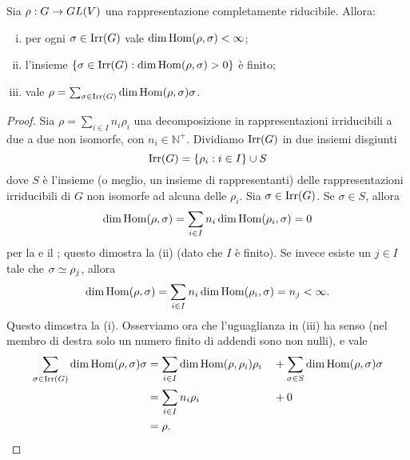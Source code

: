 \begin{proposition}
Sia $\rho:G\to GL(V)$ una rappresentazione completamente riducibile. Allora:
\begin{enumerate}[(i)]
\item per ogni $\sigma\in\operatorname{Irr}(G)$ vale $\dim\operatorname{Hom}(\rho,\sigma)<\infty$;
\item l'insieme $\{\sigma\in\operatorname{Irr}(G):\dim\operatorname{Hom}(\rho,\sigma)>0\}$ è finito;
\item vale $\rho=\sum_{\sigma\in\operatorname{Irr}(G)}\dim\operatorname{Hom}(\rho,\sigma)\sigma$.
\end{enumerate}
\end{proposition}
\begin{proof}
Sia $\rho=\sum_{i\in I}n_i\rho_i$ una decomposizione in rappresentazioni irriducibili a due a due non isomorfe, con $n_i\in\mathbb{N^+}$. Dividiamo $\operatorname{Irr}(G)$ in due insiemi disgiunti
$$
\operatorname{Irr}(G)=\{\rho_i:i\in I\}\cup S
$$
dove $S$ è l'insieme (o meglio, un insieme di rappresentanti) delle rappresentazioni irriducibili di $G$ non isomorfe ad alcuna delle $\rho_i$. Sia $\sigma\in\operatorname{Irr}(G)$. Se $\sigma\in S$, allora
$$
\dim\operatorname{Hom}(\rho,\sigma)=\sum_{i\in I}n_i\dim\operatorname{Hom}(\rho_i,\sigma)=0
$$
per la  e il ; questo dimostra la (ii) (dato che $I$ è finito). Se invece esiste un $j\in I$ tale che $\sigma\simeq\rho_j$, allora
$$
\dim\operatorname{Hom}(\rho,\sigma)=\sum_{i\in I}n_i\dim\operatorname{Hom}(\rho_i,\sigma)=n_j<\infty.
$$
Questo dimostra la (i). Osserviamo ora che l'uguaglianza in (iii) ha senso (nel membro di destra solo un numero finito di addendi sono non nulli), e vale
\begin{alignat*}{2}
\sum_{\sigma\in\operatorname{Irr}(G)}\dim\operatorname{Hom}(\rho,\sigma)\sigma&=\sum_{i\in I}\dim\operatorname{Hom}(\rho,\rho_i)\rho_i&&+\sum_{\sigma\in S}\dim\operatorname{Hom}(\rho,\sigma)\sigma\\
&=\sum_{i\in I}n_i\rho_i&&+0\\
&=\rho.
\end{alignat*}
\end{proof}

